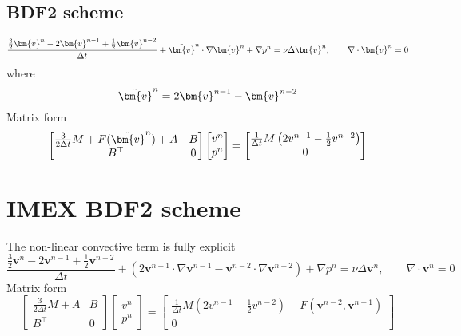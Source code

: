 \documentclass[12pt, oneside]{article}   	%
\newcommand{\vel}{\bm{v}}
\newcommand{\dt}{\Delta t}
\newcommand{\idt}{\frac{1}{\dt}}
\begin{document}
\subsection{BDF2 scheme}
\[
\frac{\frac{3}{2}\vel^n - 2\vel^{n-1} + \frac{1}{2}\vel^{n-2}}{\dt} + \tilde\vel^{n} \cdot \nabla \vel^{n} + \nabla p^n = \nu \Delta \vel^n, \qquad \nabla \cdot \vel^n = 0
\]
where
\[
\tilde\vel^n = 2 \vel^{n-1} - \vel^{n-2}
\]
Matrix form
\[
\begin{bmatrix}
\frac{3}{2\Delta t} M + F(\tilde\vel^{n}) + A & B \\
B^\top & 0 \end{bmatrix}
\begin{bmatrix}
v^n \\ p^n \end{bmatrix} = \begin{bmatrix}
\idt M \left( 2 v^{n-1} - \frac{1}{2} v^{n-2} \right) \\ 0 \end{bmatrix}
\]

\section{IMEX BDF2 scheme}

The non-linear convective term is fully explicit
\[
\frac{\frac{3}{2}\vel^n - 2\vel^{n-1} + \frac{1}{2}\vel^{n-2}}{\dt} + (2\vel^{n-1} \cdot \nabla \vel^{n-1} - \vel^{n-2} \cdot \nabla \vel^{n-2}) + \nabla p^n = \nu \Delta \vel^n, \qquad \nabla \cdot \vel^n = 0
\]
Matrix form
\[
\begin{bmatrix}
\frac{3}{2\Delta t} M + A & B \\
B^\top & 0 \end{bmatrix}
\begin{bmatrix}
v^n \\ p^n \end{bmatrix} = \begin{bmatrix}
\idt M \left( 2 v^{n-1} - \frac{1}{2} v^{n-2} \right) - F(\vel^{n-2}, \vel^{n-1}) \\
0 \end{bmatrix}
\]
\end{document}
